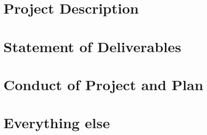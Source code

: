 \section{Project Description} \label{reqProDes}


\section{Statement of Deliverables} \label{reqDel}


\section{Conduct of Project and Plan} \label{reqConProPln}


\section{Everything else} \label{reqNotDecidedYet}
